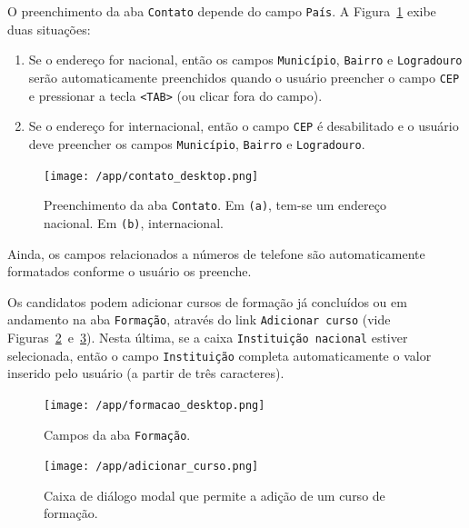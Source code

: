 \documentclass[
  10.5pt,				  %
	openright,			%
	twoside,			  %
  a5paper,
  chapter=TITLE,	%
	section=TITLE,	%
  hyphens,        %
	english,        %
	brazil          %
]{abntex2}
\begin{document}
O preenchimento da aba \texttt{Contato} depende do campo \texttt{País}. A Figura~\ref{fig:contato_desktop} exibe duas situações: 
%
\begin{enumerate}[label=(\alph*)]
  \item Se o endereço for nacional, então os campos \texttt{Município}, \texttt{Bairro} e \texttt{Logradouro} serão automaticamente preenchidos quando o usuário preencher o campo \texttt{CEP} e pressionar a tecla \texttt{<TAB>} (ou clicar fora do campo).
  \item Se o endereço for internacional, então o campo \texttt{CEP} é desabilitado e o usuário deve preencher os campos \texttt{Município}, \texttt{Bairro} e \texttt{Logradouro}.
\end{enumerate}
%
\begin{figure}[!ht]
  \caption{\label{fig:contato_desktop} Preenchimento da aba \texttt{Contato}. Em \texttt{(a)}, tem-se um endereço nacional. Em \texttt{(b)}, internacional.}
  \begin{center}
    \texttt{[image: /app/contato\_desktop.png]}
  \end{center}
\end{figure}
%
Ainda, os campos relacionados a números de telefone são automaticamente formatados conforme o usuário os preenche.

Os candidatos podem adicionar cursos de formação já concluídos ou em andamento na aba \texttt{Formação}, através do link \texttt{Adicionar curso} (vide Figuras~\ref{fig:formacao_desktop}~e~\ref{fig:adicionar_curso}). Nesta última, se a caixa \texttt{Instituição nacional} estiver selecionada, então o campo \texttt{Instituição} completa automaticamente o valor inserido pelo usuário (a partir de três caracteres).

\begin{figure}[!ht]
  \caption{\label{fig:formacao_desktop} Campos da aba \texttt{Formação}.}
  \begin{center}
    \texttt{[image: /app/formacao\_desktop.png]}
  \end{center}
\end{figure}


\begin{figure}[!ht]
  \caption{\label{fig:adicionar_curso} Caixa de diálogo modal que permite a adição de um curso de formação.}
  \begin{center}
    \texttt{[image: /app/adicionar\_curso.png]}
  \end{center}
\end{figure}
\end{document}
